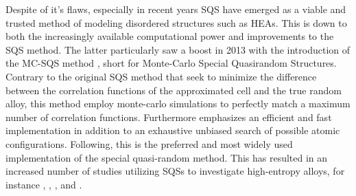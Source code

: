 Despite of it's flaws, especially in recent years SQS have emerged as a viable and trusted method of modeling disordered structures such as HEAs. This is down to both the increasingly available computational power and improvements to the SQS method. The latter particularly saw a boost in 2013 with the introduction of the MC-SQS method \cite{mcsqs2013}, short for Monte-Carlo Special Quasirandom Structures. Contrary to the original SQS method that seek to minimize the difference between the correlation functions of the approximated cell and the true random alloy, this method employ monte-carlo simulations to perfectly match a maximum number of correlation functions. Furthermore emphasizes an efficient and fast implementation in addition to an exhaustive unbiased search of possible atomic configurations. Following, this is the preferred and most widely used 
implementation of the special quasi-random method. This has resulted in an increased number of studies utilizing SQSs to investigate high-entropy alloys, for instance \cite{WANG2021128754}, \cite{WEI2021167432}, \cite{RASHID2014285}, and \cite{SORKIN2021160776}.   






























































